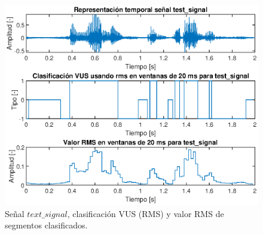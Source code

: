 \begin{figure}[H]
    \centering
    \includegraphics[width = .9\linewidth]{figures/p2_2grafs.eps}
    \caption{Señal $text\_signal$, clasificación VUS (RMS) y valor RMS de segmentos clasificados.}
    \label{fig:p2_2grafs}
\end{figure}








